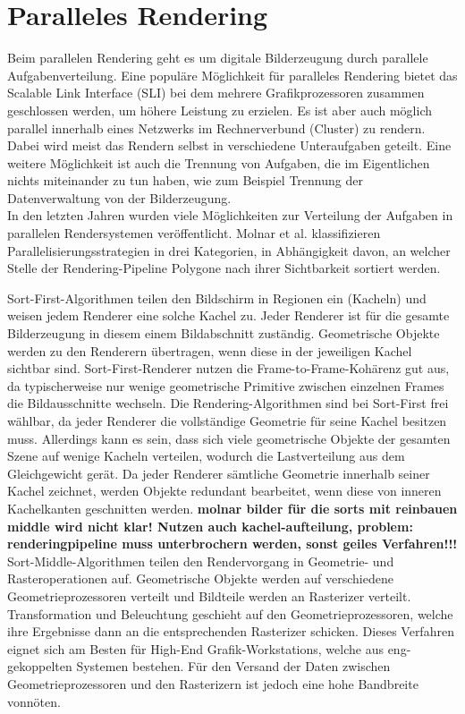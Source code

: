 \section{Paralleles Rendering}
\label{sec:relwork:parrender}
Beim parallelen Rendering geht es um digitale Bilderzeugung durch parallele Aufgabenverteilung. Eine populäre Möglichkeit für paralleles Rendering bietet das Scalable Link Interface (SLI) bei dem mehrere Grafikprozessoren zusammen geschlossen werden, um höhere Leistung zu erzielen. Es ist aber auch möglich parallel innerhalb eines Netzwerks im Rechnerverbund (Cluster) zu rendern. Dabei wird meist das Rendern selbst in verschiedene Unteraufgaben geteilt. Eine weitere Möglichkeit ist auch die Trennung von Aufgaben, die im Eigentlichen nichts miteinander zu tun haben, wie zum Beispiel Trennung der Datenverwaltung von der Bilderzeugung.\\
In den letzten Jahren wurden viele Möglichkeiten zur Verteilung der Aufgaben in parallelen Rendersystemen veröffentlicht. Molnar et al. \cite{molnar} klassifizieren Parallelisierungsstrategien in drei Kategorien, in Abhängigkeit davon, an welcher Stelle der Rendering-Pipeline Polygone nach ihrer Sichtbarkeit sortiert werden.

Sort-First-Algorithmen teilen den Bildschirm in Regionen ein (Kacheln) und weisen jedem Renderer eine solche Kachel zu. Jeder Renderer ist für die gesamte Bilderzeugung in diesem einem Bildabschnitt zuständig. Geometrische Objekte werden zu den Renderern übertragen, wenn diese in der jeweiligen Kachel sichtbar sind. Sort-First-Renderer nutzen die Frame-to-Frame-Kohärenz gut aus, da typischerweise nur wenige geometrische Primitive zwischen einzelnen Frames die Bildausschnitte wechseln. Die Rendering-Algorithmen sind bei Sort-First frei wählbar, da jeder Renderer die vollständige Geometrie für seine Kachel besitzen muss. Allerdings kann es sein, dass sich viele geometrische Objekte der gesamten Szene auf wenige Kacheln verteilen, wodurch die Lastverteilung aus dem Gleichgewicht gerät. Da jeder Renderer sämtliche Geometrie innerhalb seiner Kachel zeichnet, werden Objekte redundant bearbeitet, wenn diese von inneren Kachelkanten geschnitten werden.
\textbf{molnar bilder für die sorts mit reinbauen}
\textbf{middle wird nicht klar! Nutzen auch kachel-aufteilung, problem: renderingpipeline muss unterbrochern werden, sonst geiles Verfahren!!!} Sort-Middle-Algorithmen teilen den Rendervorgang in Geometrie- und Rasteroperationen auf. Geometrische Objekte werden auf verschiedene Geometrieprozessoren verteilt und Bildteile werden an Rasterizer verteilt. Transformation und Beleuchtung geschieht auf den Geometrieprozessoren, welche ihre Ergebnisse dann an die entsprechenden Rasterizer schicken. Dieses Verfahren eignet sich am Besten für High-End Grafik-Workstations, welche aus eng-gekoppelten Systemen bestehen. Für den Versand der Daten zwischen Geometrieprozessoren und den Rasterizern ist jedoch eine hohe Bandbreite vonnöten.

